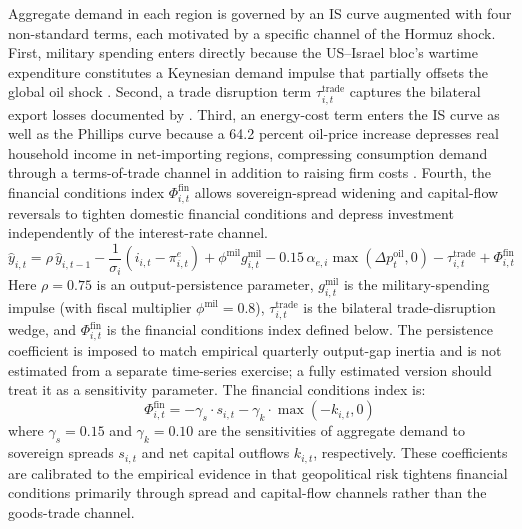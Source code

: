 \documentclass[12pt]{article}
\begin{document}
Aggregate demand in each region is governed by an IS curve augmented with four non-standard terms, each motivated by a specific channel of the Hormuz shock. First, military spending enters directly because the US--Israel bloc's wartime expenditure constitutes a Keynesian demand impulse that partially offsets the global oil shock \citep{ramey2011identifying}. Second, a trade disruption term $\tau^{\text{trade}}_{i,t}$ captures the bilateral export losses documented by \citet{federle2026price}. Third, an energy-cost term enters the IS curve as well as the Phillips curve because a 64.2 percent oil-price increase depresses real household income in net-importing regions, compressing consumption demand through a terms-of-trade channel in addition to raising firm costs \citep{blanchard2007macroeconomic}. Fourth, the financial conditions index $\Phi^{\text{fin}}_{i,t}$ allows sovereign-spread widening and capital-flow reversals to tighten domestic financial conditions and depress investment independently of the interest-rate channel.
\begin{equation}
\hat{y}_{i,t} = \rho \, \hat{y}_{i,t-1} - \frac{1}{\sigma_i}(i_{i,t} - \pi^e_{i,t}) + \phi^{\text{mil}} g^{\text{mil}}_{i,t} - 0.15\,\alpha_{e,i} \max(\Delta p^{\text{oil}}_t, 0) - \tau^{\text{trade}}_{i,t} + \Phi^{\text{fin}}_{i,t}
\label{eq:is}
\end{equation}
Here $\rho = 0.75$ is an output-persistence parameter, $g^{\text{mil}}_{i,t}$ is the military-spending impulse (with fiscal multiplier $\phi^{\text{mil}} = 0.8$), $\tau^{\text{trade}}_{i,t}$ is the bilateral trade-disruption wedge, and $\Phi^{\text{fin}}_{i,t}$ is the financial conditions index defined below. The persistence coefficient is imposed to match empirical quarterly output-gap inertia and is not estimated from a separate time-series exercise; a fully estimated version should treat it as a sensitivity parameter. The financial conditions index is:
\begin{equation}
\Phi^{\text{fin}}_{i,t} = -\gamma_s \cdot s_{i,t} - \gamma_k \cdot \max(-k_{i,t}, 0)
\label{eq:fci}
\end{equation}
where $\gamma_s = 0.15$ and $\gamma_k = 0.10$ are the sensitivities of aggregate demand to sovereign spreads $s_{i,t}$ and net capital outflows $k_{i,t}$, respectively. These coefficients are calibrated to the empirical evidence in \citet{caldara2022measuring} that geopolitical risk tightens financial conditions primarily through spread and capital-flow channels rather than the goods-trade channel.
\end{document}
